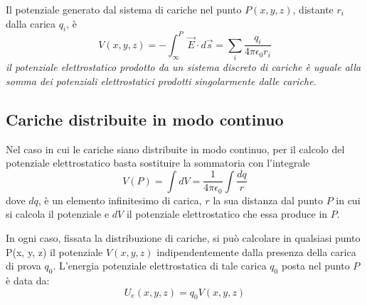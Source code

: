 \documentclass[class=book, crop=false, oneside, 12pt]{standalone}
\begin{document}
Il potenziale generato dal sistema di cariche nel punto \(P (x, y, z)\), distante \(r_i\) dalla carica \(q_i\), è 
\begin{equation}
    V(x,y,z) = - \int_{\infty}^P \overrightarrow{E} \cdot d \overrightarrow{s} = \sum_i \frac{q_i}{4 \pi \epsilon_0 r_i}
\end{equation}
\emph{il potenziale elettrostatico prodotto da un sistema discreto di cariche è uguale alla somma dei potenziali elettrostatici prodotti singolarmente dalle cariche}.

\subsection{Cariche distribuite in modo continuo}

Nel caso in cui le cariche siano distribuite in modo continuo, per il calcolo del potenziale elettrostatico basta sostituire la sommatoria con l'integrale
\begin{equation}
    V (P) = \int dV = \frac{1}{4 \pi \epsilon_0} \int \frac{d q}{r}
\end{equation}
dove \(dq\), è un elemento infinitesimo di carica, \(r\) la sua distanza dal punto \(P\) in cui si calcola il potenziale e \(dV\) il potenziale elettrostatico che essa produce in \(P\).

In ogni caso, fissata la distribuzione di cariche, si può calcolare in qualsiasi punto P(x, y, z) il potenziale \(V(x, y, z)\) indipendentemente dalla presenza della carica di prova \(q_0\).  
L'energia potenziale elettrostatica di tale carica \(q_0\) posta nel punto \(P\) è data da:
\begin{equation}
    U_e (x,y,z) = q_0 V(x,y,z)
\end{equation}
\end{document}
